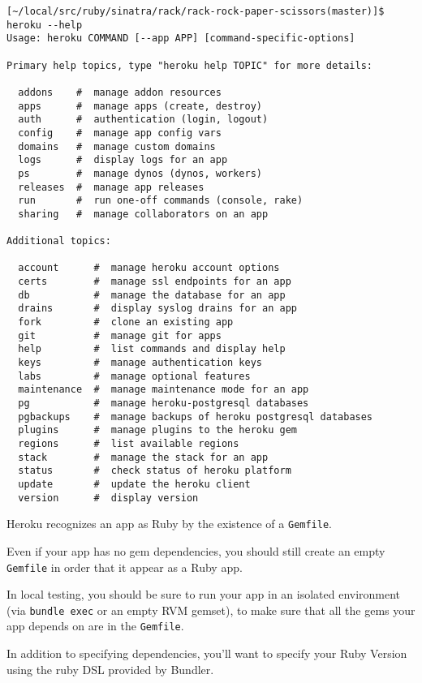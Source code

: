 \begin{verbatim}
[~/local/src/ruby/sinatra/rack/rack-rock-paper-scissors(master)]$ heroku --help
Usage: heroku COMMAND [--app APP] [command-specific-options]

Primary help topics, type "heroku help TOPIC" for more details:

  addons    #  manage addon resources
  apps      #  manage apps (create, destroy)
  auth      #  authentication (login, logout)
  config    #  manage app config vars
  domains   #  manage custom domains
  logs      #  display logs for an app
  ps        #  manage dynos (dynos, workers)
  releases  #  manage app releases
  run       #  run one-off commands (console, rake)
  sharing   #  manage collaborators on an app

Additional topics:

  account      #  manage heroku account options
  certs        #  manage ssl endpoints for an app
  db           #  manage the database for an app
  drains       #  display syslog drains for an app
  fork         #  clone an existing app
  git          #  manage git for apps
  help         #  list commands and display help
  keys         #  manage authentication keys
  labs         #  manage optional features
  maintenance  #  manage maintenance mode for an app
  pg           #  manage heroku-postgresql databases
  pgbackups    #  manage backups of heroku postgresql databases
  plugins      #  manage plugins to the heroku gem
  regions      #  list available regions
  stack        #  manage the stack for an app
  status       #  check status of heroku platform
  update       #  update the heroku client
  version      #  display version
\end{verbatim}


Heroku recognizes an app as Ruby by the existence of a \verb|Gemfile|.

Even if your app has no gem dependencies, you should still create
an empty \verb|Gemfile| in order that it appear as a Ruby app.

In local testing, you should be sure to run your app in an isolated
environment (via \verb|bundle exec| or an empty RVM gemset), to make sure
that all the gems your app depends on are in the \verb|Gemfile|.

In addition to specifying dependencies, you’ll want to specify your
Ruby Version using the ruby DSL provided by Bundler.

